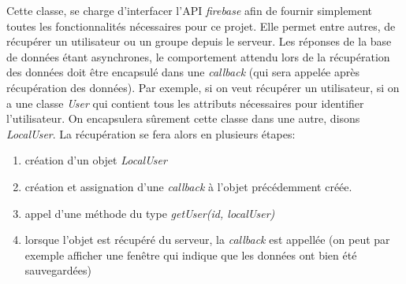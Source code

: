 Cette classe, se charge d'interfacer l'API \textit{firebase} afin de fournir simplement toutes les fonctionnalités nécessaires pour
ce projet. Elle permet entre autres, de récupérer un utilisateur ou un groupe depuis le serveur. Les réponses de la base de
données étant asynchrones, le comportement attendu lors de la récupération des données doit être encapsulé dans une
\textit{callback} (qui sera appelée après récupération des données). Par exemple, si on veut récupérer un utilisateur, si on a une
classe \textit{User} qui contient tous les attributs nécessaires pour identifier l'utilisateur. On encapsulera sûrement cette
classe dans une autre, disons \textit{LocalUser}. La récupération se fera alors en plusieurs étapes:
\begin{enumerate}
    \item création d'un objet \textit{LocalUser}
    \item création et assignation d'une \textit{callback} à l'objet précédemment créée.
    \item appel d'une méthode du type \textit{getUser(id, localUser)}
    \item lorsque l'objet est récupéré du serveur,  la \textit{callback} est appellée (on peut par exemple afficher une fenêtre
        qui indique que les données ont bien été sauvegardées)
\end{enumerate}

